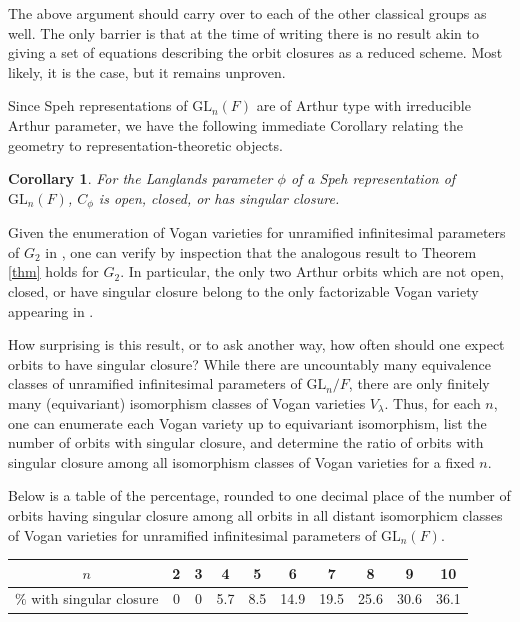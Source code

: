 \documentclass[12pt]{amsart}
\theoremstyle{plain}
\newtheorem{corollary}[theorem]{Corollary}
\theoremstyle{definition}
\newcommand{\1}{\mathbbm{1}}
\newcommand{\GL}{\mathrm{GL}}
\begin{document}
	{\allowdisplaybreaks
	The above argument should carry over to each of the other classical groups as well.  
	The only barrier is that at the time of writing there is no result akin to \cite[Theorem 2.2]{LM} giving a set of equations describing the orbit closures as a reduced scheme.  
	Most likely, it is the case, but it remains unproven.  
	
	Since Speh representations of $\GL_n(F)$ are of Arthur type with irreducible Arthur parameter, we have the following immediate Corollary relating the geometry to representation-theoretic objects. 
	
	\begin{corollary}
		For the Langlands parameter $\phi$ of a Speh representation of $\GL_n(F)$, $C_\phi$ is open, closed, or has singular closure. 
	\end{corollary}
	
	Given the enumeration of Vogan varieties for unramified infinitesimal parameters of $G_2$ in \cite{BCFZ}, one can verify by inspection that the analogous result to Theorem \ref{thm} holds for $G_2$.  
	In particular, the only two Arthur orbits which are not open, closed, or have singular closure belong to the only factorizable Vogan variety appearing in \cite[Example 2.10]{BCFZ}.
}
	
	\iffalse
	How surprising is this result, or to ask another way, how often should one expect orbits to have singular closure?
	While there are uncountably many equivalence classes of unramified infinitesimal parameters of $\GL_n/F$, there are only finitely many (equivariant) isomorphism classes of Vogan varieties $V_\lambda$.  
	Thus, for each $n$, one can enumerate each Vogan variety up to equivariant isomorphism, list the number of orbits with singular closure, and determine the ratio of orbits with singular closure among all isomorphism classes of Vogan varieties for a fixed $n$.  
	
	Below is a table of the percentage, rounded to one decimal place of the number of orbits having singular closure among all orbits in all distant isomorphicm classes of Vogan varieties for unramified infinitesimal parameters of $\GL_n(F)$.  
	\begin{center}
		\begin{tabular}{|| c || c | c | c | c | c | c | c | c | c ||}
			\hline 
			\hline 
			$n$ & 2 & 3 & 4 & 5 & 6 & 7 & 8 & 9 & 10\\
			\hline 
			$\%$ with singular closure &  0 & 0 & 5.7 & 8.5 & 14.9 & 19.5 & 25.6 & 30.6 & 36.1 \\
			\hline 
			\hline
		\end{tabular}
	\end{center}
	
\end{document}
